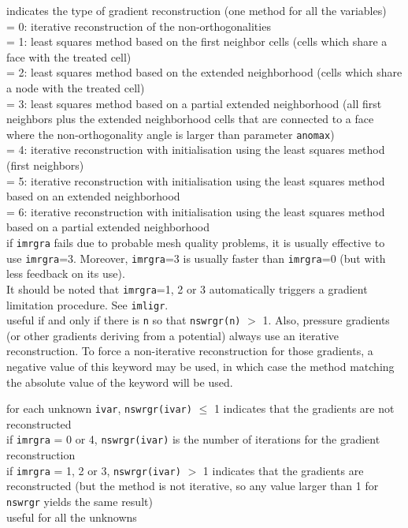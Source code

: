 {indicates the type of gradient reconstruction (one method for all the
variables)\\
\hspace*{1.3cm}= 0: iterative reconstruction of the non-orthogonalities\\
\hspace*{1.3cm}= 1: least squares method based on the first neighbor cells
(cells which share a face with the treated cell)\\
\hspace*{1.3cm}= 2: least squares method based on the extended neighborhood
(cells which share a node with the treated cell)\\
\hspace*{1.3cm}= 3: least squares method based on a partial extended
neighborhood (all first neighbors plus the extended neighborhood cells that
are connected to a face where the non-orthogonality angle is larger than
parameter {\tt anomax})\\
\hspace*{1.3cm}= 4: iterative reconstruction with initialisation using the least
squares method (first neighbors)\\
\hspace*{1.3cm}= 5: iterative reconstruction with initialisation using the least
squares method based on an extended neighborhood\\
\hspace*{1.3cm}= 6: iterative reconstruction with initialisation using the least
squares method based on a partial extended neighborhood\\
if {\tt imrgra} fails due to probable mesh quality problems, it is usually effective
to use {\tt imrgra}=3. Moreover, {\tt imrgra}=3 is usually faster than
{\tt imrgra}=0 (but with less feedback on its use).\\
It should be noted that {\tt imrgra}=1, 2 or 3 automatically triggers a gradient
limitation procedure. See {\tt imligr}.\\
useful if and only if there is {\tt n} so that {\tt nswrgr(n)} $>$ 1.
Also, pressure gradients (or other gradients deriving from a potential)
always use an iterative reconstruction. To force a non-iterative
reconstruction for those gradients, a negative value of this keyword may be
used, in which case the method matching the absolute value of the keyword will
be used.}

{for each unknown {\tt ivar}, {\tt nswrgr(ivar)} $\leqslant$ 1 indicates that the
gradients are not reconstructed\\
\hspace*{1.3cm}if {\tt imrgra} = 0 or 4, {\tt nswrgr(ivar)} is the number of
iterations for the gradient reconstruction\\
\hspace*{1.3cm}if {\tt imrgra} = 1, 2 or 3, {\tt nswrgr(ivar)} $>$ 1 indicates that
the gradients are reconstructed (but the method is not iterative, so any value
larger than 1 for {\tt nswrgr} yields the same result)\\
useful for all the unknowns}

